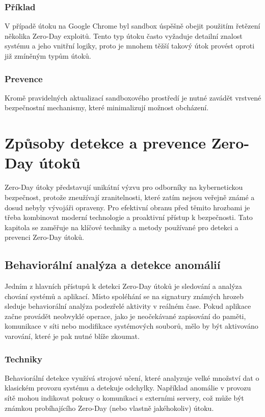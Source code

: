 \documentclass[11pt, conference, a4paper]{IEEEtran}
\begin{document}
\subsubsection{Příklad} V případě útoku na Google Chrome byl sandbox úspěšně obejit použitím řetězení několika Zero-Day exploitů. Tento typ útoku často vyžaduje detailní znalost systému a jeho vnitřní logiky, proto je mnohem těžší takový \' utok provést oproti již zmíněným typ\r um \' utok\r u.
\subsubsection{Prevence} Kromě pravidelných aktualizací sandboxového prostředí je nutné zavádět vrstvené bezpečnostní mechanismy, které minimalizují možnost obcházení.
\section{Způsoby detekce a prevence Zero-Day útoků}
Zero-Day útoky představují unikátní výzvu pro odborníky na kybernetickou bezpečnost, protože zneužívají zranitelnosti, které zatím nejsou veřejně známé a dosud nebyly vývojáři opraveny. Pro efektivní obranu před těmito hrozbami je třeba kombinovat moderní technologie a proaktivní přístup k bezpečnosti. Tato kapitola se zaměřuje na klíčové techniky a metody používané pro detekci a prevenci Zero-Day útoků.

\subsection{Behaviorální analýza a detekce anomálií \cite{Smith}}
Jedním z hlavních přístupů k detekci Zero-Day útoků je sledování a analýza chování systémů a aplikací. Místo spoléhání se na signatury známých hrozeb sleduje behaviorální analýza podezřelé aktivity v reálném čase. Pokud aplikace začne provádět neobvyklé operace, jako je neočekávané zapisování do paměti, komunikace v síti nebo modifikace systémových souborů, mělo by být aktivováno varování, které je pak nutné blíže zkoumat.

\subsubsection{Techniky} Behaviorální detekce využívá strojové učení, které analyzuje velké množství dat o klasick\' em provozu systému a detekuje odchylky. Například anomálie v provozu sítě mohou indikovat pokusy o komunikaci s externími servery, což může být známkou probíhajícího Zero-Day (nebo vlastně jakéhokoliv) útoku.
\end{document}
